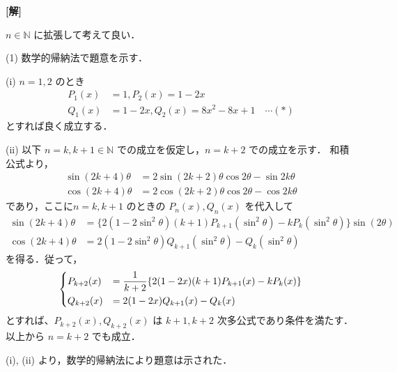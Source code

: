 \documentclass[a4paper,10pt]{ltjsarticle}
\begin{document}
\begin{multicols}{2}
{\bf[解]}

$n \in \mathbb{N}$ に拡張して考えて良い．

(1) 数学的帰納法で題意を示す．

\vspace{10pt}

(i)
$n=1, 2$ のとき
\begin{align*}
    P_1(x) &= 1, P_2(x) = 1-2x \\
    Q_1(x) &= 1-2x, Q_2(x) = 8x^2 - 8x + 1 \quad \cdots (*)
\end{align*}
とすれば良く成立する．

\vspace{10pt}

(ii)
以下 $n=k, k+1 \in \mathbb{N}$ での成立を仮定し，$n=k+2$ での成立を示す．
和積公式より，
\begin{align*}
    \sin(2k+4)\theta 
    &= 2\sin(2k+2)\theta\cos2\theta - \sin2k\theta \\
    \cos(2k+4)\theta 
    &= 2\cos(2k+2)\theta\cos2\theta - \cos2k\theta 
\end{align*}
であり，ここに$n=k, k+1$ のときの $P_n(x), Q_n(x)$ を代入して
\begin{align*}
    \sin(2k+4)\theta 
    &= \{2(1-2\sin^2\theta)(k+1)P_{k+1}(\sin^2\theta) - kP_k(\sin^2\theta)\}\sin(2\theta) \\
    \cos(2k+4)\theta
    &= 2(1-2\sin^2\theta)Q_{k+1}(\sin^2\theta) - Q_k(\sin^2\theta)
\end{align*}
を得る．従って，
\begin{align*}
    \begin{dcases}
        P_{k+2}(x) &= \frac{1}{k+2}\{2(1-2x)(k+1)P_{k+1}(x) - kP_k(x)\} \\
        Q_{k+2}(x) &= 2(1-2x)Q_{k+1}(x) - Q_k(x)
    \end{dcases}
\end{align*}
とすれば、$P_{k+2}(x), Q_{k+2}(x)$ は $k+1, k+2$ 次多公式であり条件を満たす．以上から $n=k+2$ でも成立．

(i), (ii) より，数学的帰納法により題意は示された．


\end{multicols}
\end{document}
